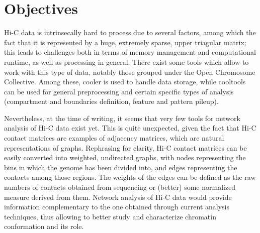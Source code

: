 \graphicspath{{chapters/03_objectives/}}
\chapter{Objectives}


Hi-C data is intrinsecally hard to process due to several factors, among which the fact that it is represented by a huge, extremely sparse, upper triagular matrix; this leads to challenges both in terms of memory management and computational runtime, as well as processing in general. There exist some tools which allow to work with this type of data, notably those grouped under the Open Chromosome Collective\cite{openchromosomecollective}. Among these, cooler\cite{cooler2020} is used to handle data storage, while cooltools\cite{cooltools2022} can be used for general preprocessing and certain specific types of analysis (compartment and boundaries definition, feature and pattern pileup). 

Nevertheless, at the time of writing, it seems that very few tools for network analysis of Hi-C data exist yet\cite{chromatinnetworks2023}. This is quite unexpected, given the fact that Hi-C contact matrices are examples of adjacency matrices, which are natural representations of graphs. Rephrasing for clarity, Hi-C contact matrices can be easily converted into weighted, undirected graphs, with nodes representing the bins in which the genome has been divided into, and edges representing the contacts among those regions. The weights of the edges can be defined as the raw numbers of contacts obtained from sequencing or (better) some normalized measure derived from them. Network analysis of Hi-C data would provide information complementary to the one obtained through current analysis techniques, thus allowing to better study and characterize chromatin conformation and its role. 

